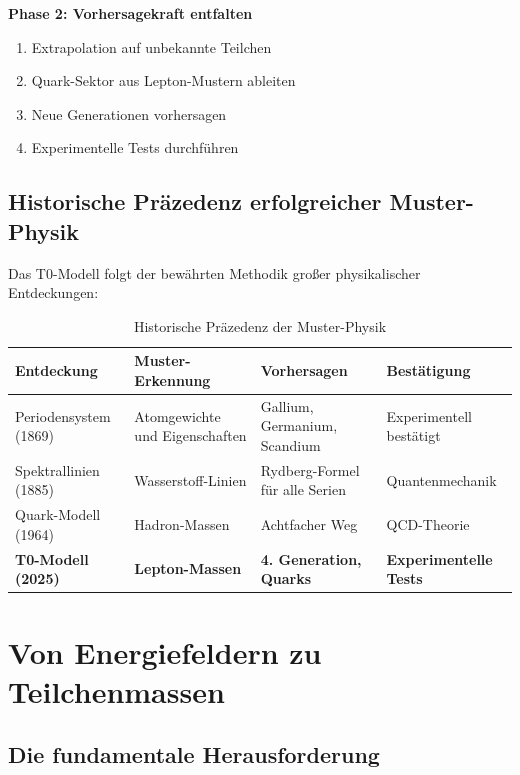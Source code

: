 	\textbf{Phase 2: Vorhersagekraft entfalten}
	\begin{enumerate}
		\item Extrapolation auf unbekannte Teilchen
		\item Quark-Sektor aus Lepton-Mustern ableiten
		\item Neue Generationen vorhersagen
		\item Experimentelle Tests durchführen
	\end{enumerate}
	
	\subsection{Historische Präzedenz erfolgreicher Muster-Physik}
	\label{subsec:historische_praezedenz}
	
	Das T0-Modell folgt der bewährten Methodik großer physikalischer Entdeckungen:
	
	\begin{table}[H]
		\centering
		\begin{tabular}{p{3cm}p{4cm}p{4cm}p{3cm}}
			\toprule
			\textbf{Entdeckung} & \textbf{Muster-Erkennung} & \textbf{Vorhersagen} & \textbf{Bestätigung} \\
			\midrule
			Periodensystem (1869) & Atomgewichte und Eigenschaften & Gallium, Germanium, Scandium & Experimentell bestätigt \\
			Spektrallinien (1885) & Wasserstoff-Linien & Rydberg-Formel für alle Serien & Quantenmechanik \\
			Quark-Modell (1964) & Hadron-Massen & Achtfacher Weg & QCD-Theorie \\
			\textbf{T0-Modell (2025)} & \textbf{Lepton-Massen} & \textbf{4. Generation, Quarks} & \textbf{Experimentelle Tests} \\
			\bottomrule
		\end{tabular}
		\caption{Historische Präzedenz der Muster-Physik}
		\label{tab:historische_praezedenz}
	\end{table}
	
	\section{Von Energiefeldern zu Teilchenmassen}
	\label{sec:energy_fields_to_masses}
	
	\subsection{Die fundamentale Herausforderung}
	\label{subsec:fundamental_challenge}
	
